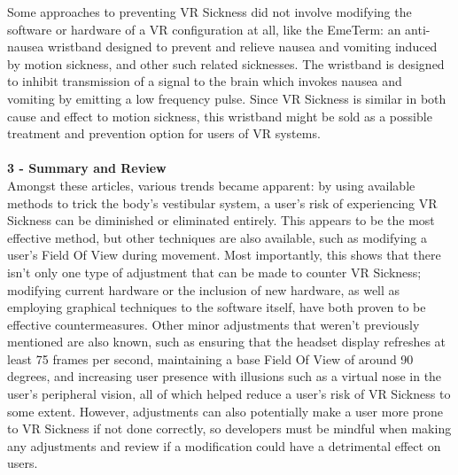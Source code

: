 \documentclass{article}
\begin{document}
Some approaches to preventing VR Sickness did not involve modifying the software or hardware of a VR configuration at all, like the EmeTerm: an anti-nausea wristband designed to prevent and relieve nausea and vomiting induced by motion sickness, and other such related sicknesses. The wristband is designed to inhibit transmission of a signal to the brain which invokes nausea and vomiting by emitting a low frequency pulse\cite{article2cite}. Since VR Sickness is similar in both cause and effect to motion sickness, this wristband might be sold as a possible treatment and prevention option for users of VR systems. \\ \\

\textbf{3 - Summary and Review} \\
Amongst these articles, various trends became apparent: by using available methods to trick the body's vestibular system, a user's risk of experiencing VR Sickness can be diminished or eliminated entirely. This appears to be the most effective method, but other techniques are also available, such as modifying a user's Field Of View during movement. Most importantly, this shows that there isn't only one type of adjustment that can be made to counter VR Sickness; modifying current hardware or the inclusion of new hardware, as well as employing graphical techniques to the software itself, have both proven to be effective countermeasures. Other minor adjustments that weren't previously mentioned are also known, such as ensuring that the headset display refreshes at least 75 frames per second\cite{article1cite}, maintaining a base Field Of View of around 90 degrees\cite{article3cite}, and increasing user presence with illusions such as a virtual nose in the user's peripheral vision\cite{article3cite}, all of which helped reduce a user's risk of VR Sickness to some extent. However, adjustments can also potentially make a user more prone to VR Sickness if not done correctly, so developers must be mindful when making any adjustments and review if a modification could have a detrimental effect on users. \\
\end{document}

